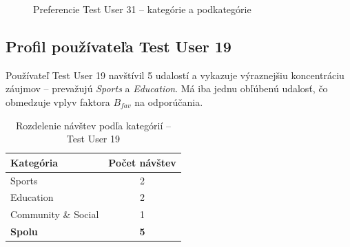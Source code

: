 \begin{figure}[H]
\centering
\begin{minipage}{0.48\textwidth}
    \centering
    \caption{Hlavné kategórie}
\end{minipage}
\hfill
\begin{minipage}{0.48\textwidth}
    \centering
    \caption{Podkategórie}
\end{minipage}
\caption{Preferencie Test User 31 – kategórie a podkategórie}
\label{fig:profil_u31}
\end{figure}

\subsection{Profil používateľa Test User 19}

Používateľ Test User 19 navštívil 5 udalostí a vykazuje výraznejšiu koncentráciu záujmov – prevažujú \textit{Sports} a \textit{Education}. Má iba jednu obľúbenú udalosť, čo obmedzuje vplyv faktora $B_{fav}$ na odporúčania.

\begin{table}[H]
\centering
\caption{Rozdelenie návštev podľa kategórií – Test User 19}
\label{tab:rozdelenie_u19}
\begin{tabular}{|l|c|}
\hline
\textbf{Kategória} & \textbf{Počet návštev} \\ \hline
Sports              & 2 \\
Education           & 2 \\
Community \& Social & 1 \\ \hline
\textbf{Spolu}      & \textbf{5} \\ \hline
\end{tabular}
\end{table}

